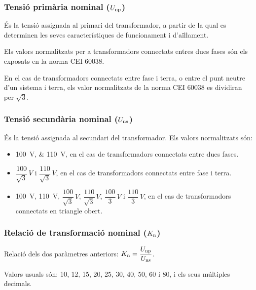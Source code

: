 \subsubsection{Tensió primària nominal ($U_\mathrm{np}$)}

És la tensió assignada al primari del transformador, a partir de la
qual es determinen les seves característiques de funcionament i
d'aïllament.

Els valors normalitzats per a transformadors connectats entres dues fases són els exposats en la norma CEI 60038.

En el cas de transformadors connectats entre fase i terra, o entre el punt neutre d'un sistema i terra, els valor normalitzats de la norma CEI 60038 es dividiran per $\sqrt{3}$.


\subsubsection{Tensió secundària nominal ($U_\mathrm{ns}$)}

És la tensió assignada al secundari del transformador.
Els valors normalitzats són:
\begin{itemize}
    \item \SIlist{100;110}{V}, en el cas de transformadors connectats
    entre dues fases.
    \item $\dfrac{100}{\sqrt{3}}\si{\,V}$ i
        $\dfrac{110}{\sqrt{3}}\si{\,V}$, en el cas de transformadors
        connectats entre fase i terra.
    \item \SI{100}{V}, \SI{110}{V}, $\dfrac{100}{\sqrt{3}}\si{\,V}$,
    $\dfrac{110}{\sqrt{3}}\si{\,V}$, $\dfrac{100}{3}\si{\,V}$   i
    $\dfrac{110}{3}\si{\,V}$, en el cas de transformadors
    connectats en triangle obert.
\end{itemize}

\subsubsection{Relació de transformació nominal ($K_\mathrm{n}$)}

 Relació  dels dos paràmetres anteriors: $K_\mathrm{n} = \dfrac{U_\mathrm{np}}{U_\mathrm{ns}}$.

 Valors usuals són: 10, 12, 15, 20, 25, 30, 40, 50, 60 i 80, i els seus múltiples decimals.

